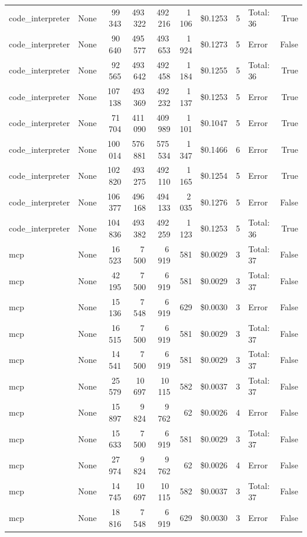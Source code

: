 \documentclass[a4paper,11pt]{article}
\begin{document}
\begin{table}[H]
{\begin{tabular}{l r r r r r r r l r}
code\_interpreter & None & 99\,343 & 493\,322 & 492\,216 & 1\,106 & \$0.1253 & 5 & Total: 36 & True \\
code\_interpreter & None & 90\,640 & 495\,577 & 493\,653 & 1\,924 & \$0.1273 & 5 & Error & False \\
code\_interpreter & None & 92\,565 & 493\,642 & 492\,458 & 1\,184 & \$0.1255 & 5 & Total: 36 & True \\
code\_interpreter & None & 107\,138 & 493\,369 & 492\,232 & 1\,137 & \$0.1253 & 5 & Error & True \\
code\_interpreter & None & 71\,704 & 411\,090 & 409\,989 & 1\,101 & \$0.1047 & 5 & Error & True \\
code\_interpreter & None & 100\,014 & 576\,881 & 575\,534 & 1\,347 & \$0.1466 & 6 & Error & True \\
code\_interpreter & None & 102\,820 & 493\,275 & 492\,110 & 1\,165 & \$0.1254 & 5 & Error & True \\
code\_interpreter & None & 106\,377 & 496\,168 & 494\,133 & 2\,035 & \$0.1276 & 5 & Error & False \\
code\_interpreter & None & 104\,836 & 493\,382 & 492\,259 & 1\,123 & \$0.1253 & 5 & Total: 36 & True \\
\midrule
mcp & None & 16\,523 & 7\,500 & 6\,919 & 581 & \$0.0029 & 3 & Total: 37 & False \\
mcp & None & 42\,195 & 7\,500 & 6\,919 & 581 & \$0.0029 & 3 & Total: 37 & False \\
mcp & None & 15\,136 & 7\,548 & 6\,919 & 629 & \$0.0030 & 3 & Error & False \\
mcp & None & 16\,515 & 7\,500 & 6\,919 & 581 & \$0.0029 & 3 & Total: 37 & False \\
mcp & None & 14\,541 & 7\,500 & 6\,919 & 581 & \$0.0029 & 3 & Total: 37 & False \\
mcp & None & 25\,579 & 10\,697 & 10\,115 & 582 & \$0.0037 & 3 & Total: 37 & False \\
mcp & None & 15\,897 & 9\,824 & 9\,762 & 62 & \$0.0026 & 4 & Error & False \\
mcp & None & 15\,633 & 7\,500 & 6\,919 & 581 & \$0.0029 & 3 & Total: 37 & False \\
mcp & None & 27\,974 & 9\,824 & 9\,762 & 62 & \$0.0026 & 4 & Error & False \\
mcp & None & 14\,745 & 10\,697 & 10\,115 & 582 & \$0.0037 & 3 & Total: 37 & False \\
mcp & None & 18\,816 & 7\,548 & 6\,919 & 629 & \$0.0030 & 3 & Error & False \\

\end{tabular}}
\end{table}
\end{document}
